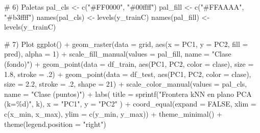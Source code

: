 \documentclass[
  letterpaper,
  DIV=11,
  numbers=noendperiod]{scrartcl}
\newenvironment{Shaded}{\begin{snugshade}}{\end{snugshade}}
\newcommand{\AttributeTok}[1]{\textcolor[rgb]{0.40,0.45,0.13}{#1}}
\newcommand{\CommentTok}[1]{\textcolor[rgb]{0.37,0.37,0.37}{#1}}
\newcommand{\ConstantTok}[1]{\textcolor[rgb]{0.56,0.35,0.01}{#1}}
\newcommand{\DecValTok}[1]{\textcolor[rgb]{0.68,0.00,0.00}{#1}}
\newcommand{\FloatTok}[1]{\textcolor[rgb]{0.68,0.00,0.00}{#1}}
\newcommand{\FunctionTok}[1]{\textcolor[rgb]{0.28,0.35,0.67}{#1}}
\newcommand{\NormalTok}[1]{\textcolor[rgb]{0.00,0.23,0.31}{#1}}
\newcommand{\OtherTok}[1]{\textcolor[rgb]{0.00,0.23,0.31}{#1}}
\newcommand{\SpecialCharTok}[1]{\textcolor[rgb]{0.37,0.37,0.37}{#1}}
\newcommand{\StringTok}[1]{\textcolor[rgb]{0.13,0.47,0.30}{#1}}
\begin{document}
\begin{Shaded}
\begin{Highlighting}[]
\CommentTok{\# 6) Paletas}
\NormalTok{pal\_cls  }\OtherTok{\textless{}{-}} \FunctionTok{c}\NormalTok{(}\StringTok{"\#FF0000"}\NormalTok{, }\StringTok{"\#00ffff"}\NormalTok{)}
\NormalTok{pal\_fill }\OtherTok{\textless{}{-}} \FunctionTok{c}\NormalTok{(}\StringTok{"\#FFAAAA"}\NormalTok{, }\StringTok{"\#b3ffff"}\NormalTok{)}
\FunctionTok{names}\NormalTok{(pal\_cls)  }\OtherTok{\textless{}{-}} \FunctionTok{levels}\NormalTok{(y\_trainC)}
\FunctionTok{names}\NormalTok{(pal\_fill) }\OtherTok{\textless{}{-}} \FunctionTok{levels}\NormalTok{(y\_trainC)}

\CommentTok{\# 7) Plot}
\FunctionTok{ggplot}\NormalTok{() }\SpecialCharTok{+}
  \FunctionTok{geom\_raster}\NormalTok{(}\AttributeTok{data =}\NormalTok{ grid, }\FunctionTok{aes}\NormalTok{(}\AttributeTok{x =}\NormalTok{ PC1, }\AttributeTok{y =}\NormalTok{ PC2, }\AttributeTok{fill =}\NormalTok{ pred), }\AttributeTok{alpha =} \DecValTok{1}\NormalTok{) }\SpecialCharTok{+}
  \FunctionTok{scale\_fill\_manual}\NormalTok{(}\AttributeTok{values =}\NormalTok{ pal\_fill, }\AttributeTok{name =} \StringTok{"Clase (fondo)"}\NormalTok{) }\SpecialCharTok{+}
  \FunctionTok{geom\_point}\NormalTok{(}\AttributeTok{data =}\NormalTok{ df\_train, }\FunctionTok{aes}\NormalTok{(PC1, PC2, }\AttributeTok{color =}\NormalTok{ clase), }\AttributeTok{size =} \FloatTok{1.8}\NormalTok{, }\AttributeTok{stroke =}\NormalTok{ .}\DecValTok{2}\NormalTok{) }\SpecialCharTok{+}
  \FunctionTok{geom\_point}\NormalTok{(}\AttributeTok{data =}\NormalTok{ df\_test,  }\FunctionTok{aes}\NormalTok{(PC1, PC2, }\AttributeTok{color =}\NormalTok{ clase), }\AttributeTok{size =} \FloatTok{2.2}\NormalTok{, }\AttributeTok{stroke =}\NormalTok{ .}\DecValTok{2}\NormalTok{, }\AttributeTok{shape =} \DecValTok{21}\NormalTok{) }\SpecialCharTok{+}
  \FunctionTok{scale\_color\_manual}\NormalTok{(}\AttributeTok{values =}\NormalTok{ pal\_cls, }\AttributeTok{name =} \StringTok{"Clase (puntos)"}\NormalTok{) }\SpecialCharTok{+}
  \FunctionTok{labs}\NormalTok{(}
    \AttributeTok{title =} \FunctionTok{sprintf}\NormalTok{(}\StringTok{"Frontera kNN en plano PCA (k=\%d)"}\NormalTok{, k),}
    \AttributeTok{x =} \StringTok{"PC1"}\NormalTok{, }\AttributeTok{y =} \StringTok{"PC2"}
\NormalTok{  ) }\SpecialCharTok{+}
  \FunctionTok{coord\_equal}\NormalTok{(}\AttributeTok{expand =} \ConstantTok{FALSE}\NormalTok{, }\AttributeTok{xlim =} \FunctionTok{c}\NormalTok{(x\_min, x\_max), }\AttributeTok{ylim =} \FunctionTok{c}\NormalTok{(y\_min, y\_max)) }\SpecialCharTok{+}
  \FunctionTok{theme\_minimal}\NormalTok{() }\SpecialCharTok{+}
  \FunctionTok{theme}\NormalTok{(}\AttributeTok{legend.position =} \StringTok{"right"}\NormalTok{)}
\end{Highlighting}
\end{Shaded}
\end{document}
